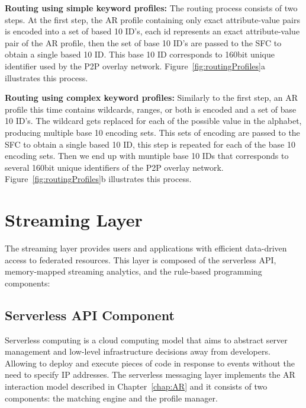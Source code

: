 \textbf{Routing using simple keyword profiles:} The routing process consists of two steps. At the first step, the AR profile containing only exact attribute-value pairs is encoded into a set of based 10 ID's, each id represents an exact attribute-value pair of the AR profile, then the set of base 10 ID's are passed to the SFC to obtain a single based 10 ID. This base 10 ID corresponds to 160bit unique identifier used by the P2P overlay network. Figure~\ref{fig:routingProfiles}a illustrates this process. \vspace{1ex} 

\textbf{Routing using complex keyword profiles:} Similarly to the first step, an AR profile this time contains wildcards, ranges, or both is encoded and a set of base 10 ID's. The wildcard gets replaced for each of the possible value in the alphabet, producing multiple base 10 encoding sets. This sets of encoding are passed to the SFC to obtain a single based 10 ID, this step is repeated for each of the base 10 encoding sets. Then we end up with muntiple base 10 IDs that corresponds to several 160bit unique identifiers of the P2P overlay network. Figure~\ref{fig:routingProfiles}b illustrates this process.


\section{Streaming Layer}

The streaming layer provides users and applications with efficient data-driven access to federated resources. This layer is composed of the serverless API, memory-mapped streaming analytics, and the rule-based programming components:

\subsection{Serverless API Component}\label{sec:serverless}


Serverless computing is a cloud computing model that aims to abstract server management and low-level infrastructure decisions away from developers. Allowing to deploy and execute pieces of code in response to events without the need to specify IP addresses. The serverless messaging layer implements the AR interaction model described in Chapter~\ref{chap:AR} and it consists of two components: the matching engine and the profile manager. 

